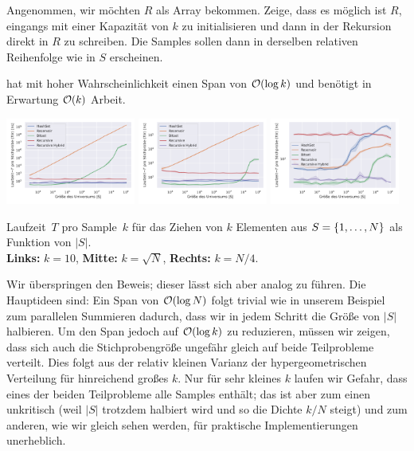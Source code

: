 \begin{exercise}
    Angenommen, wir möchten $R$ als Array bekommen.
    Zeige, dass es möglich ist $R$, eingangs mit einer Kapazität von $k$ zu initialisieren und dann in der Rekursion direkt in $R$ zu schreiben.
    Die Samples sollen dann in derselben relativen Reihenfolge wie in $S$ erscheinen.
\end{exercise}

\begin{lemma}
     hat mit hoher Wahrscheinlichkeit einen Span von $\mathcal{O}\!\left(\log k\right)$ und benötigt in Erwartung $\mathcal{O}\!\left(k\right)$ Arbeit.
\end{lemma}

\begin{widefigure}
    \includegraphics[width=0.32\textwidth]{data/gnm_recursive_scale0.pdf}\hfill
    \includegraphics[width=0.32\textwidth]{data/gnm_recursive_scale1.pdf}\hfill
    \includegraphics[width=0.32\textwidth]{data/gnm_recursive_scale2.pdf}

    \caption{
        Laufzeit~$T$ pro Sample~$k$ für das Ziehen von $k$ Elementen aus $S = \left\{1, \ldots, N\right\}$ als Funktion von $|S|$.\\
        \textbf{Links:} $k=10$, \textbf{Mitte: } $k = \sqrt{N}$, \textbf{Rechts: } $k = N / 4$.
    }
    \label{fig:benchmark_gnm_recursive_scale}
\end{widefigure}

Wir überspringen den Beweis; dieser lässt sich aber analog zu \cite{DBLP:journals/toms/Hubschle-Schneider22} führen.
Die Hauptideen sind: Ein Span von $\mathcal{O}\!\left(\log N\right)$ folgt trivial wie in unserem Beispiel zum parallelen Summieren dadurch, dass wir in jedem Schritt die Größe von $|S|$ halbieren.
Um den Span jedoch auf $\mathcal{O}\!\left(\log k\right)$ zu reduzieren, müssen wir zeigen, dass sich auch die Stichprobengröße ungefähr gleich auf beide Teilprobleme verteilt.
Dies folgt aus der relativ kleinen Varianz der hypergeometrischen Verteilung für hinreichend großes $k$.
Nur für sehr kleines $k$ laufen wir Gefahr, dass eines der beiden Teilprobleme alle Samples enthält;
das ist aber zum einen unkritisch (weil $|S|$ trotzdem halbiert wird und so die Dichte $k/N$ steigt) und zum anderen, wie wir gleich sehen werden, für praktische Implementierungen unerheblich.


